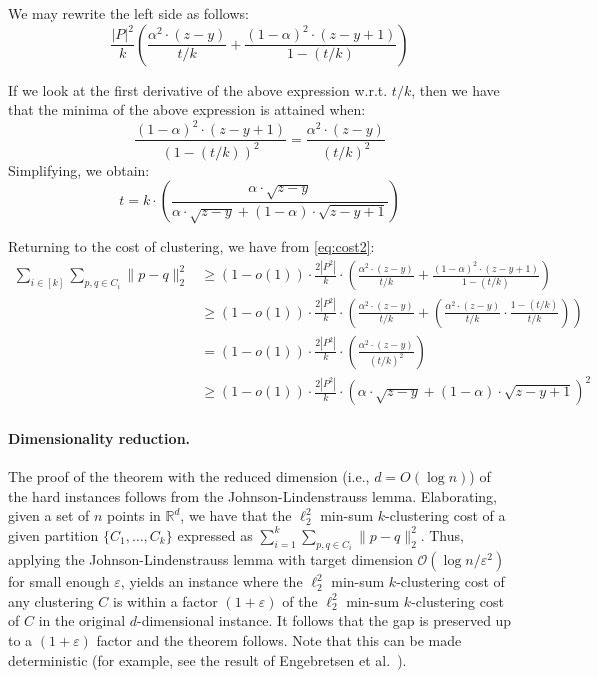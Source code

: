 \documentclass[10pt,a4paper]{amsart}
\renewcommand{\O}[1]{\ensuremath{\mathcal{O}\left(#1\right)}}
\newcommand{\eps}{\varepsilon}
\begin{document}
We may rewrite the left side as follows:
$$ \frac{|P|^2}{k}\left(   \frac{\alpha^2\cdot (z-y) }{t/k}   +    \frac{(1-\alpha)^2\cdot (z-y+1)}{1-(t/k)}  \right)$$

If we look at the first derivative of the above expression w.r.t. $t/k$, then we have that the minima of the above expression is attained when:
$$\frac{(1-\alpha)^2\cdot (z-y+1)}{(1-(t/k))^2}=\frac{\alpha^2\cdot (z-y)}{(t/k)^2}$$
Simplifying, we obtain:
$$t=k\cdot \left(\frac{\alpha\cdot \sqrt{z-y}}{\alpha\cdot \sqrt{z-y}+(1-\alpha)\cdot \sqrt{z-y+1}}\right)$$




Returning to the cost of clustering, we have from \eqref{eq:cost2}:
\begin{align*}
 \sum_{i\in[k]}\sum_{p,q\in C_i}\|p-q\|_2^2 
&\geq   (1-o(1))\cdot  \frac{2|P^2|}{k} \cdot \left(   \frac{\alpha^2\cdot (z-y) }{t/k}   +    \frac{(1-\alpha)^2\cdot (z-y+1)}{1-(t/k)}  \right)\\
&\geq (1-o(1))\cdot  \frac{2|P^2|}{k} \cdot \left(   \frac{\alpha^2\cdot (z-y) }{t/k}   +  \left(\frac{\alpha^2\cdot (z-y) }{t/k} \cdot\frac{1-(t/k)}{t/k}\right) \right)\\
&=  (1-o(1))\cdot  \frac{2|P^2|}{k} \cdot \left(  \frac{\alpha^2\cdot (z-y) }{  (t/k)^2}  \right)\\
&\ge (1-o(1))\cdot  \frac{2|P^2|}{k} \cdot    \left(\alpha\cdot \sqrt{z-y}+(1-\alpha)\cdot \sqrt{z-y+1}\right)^{2} 
\end{align*} 

\paragraph{Dimensionality reduction.}
The proof of the theorem with the reduced dimension (i.e., $d=O(\log n)$) of the hard instances follows from the Johnson-Lindenstrauss lemma. 
Elaborating, given a set of $n$ points in $\mathbb{R}^d$, we have that the $\ell_2^2$ min-sum $k$-clustering cost of a given partition $\{C_1,\ldots,C_k\}$   expressed as $\sum_{i=1}^k   \sum_{p,q \in C_i} \|p-q\|^2_2$. 
Thus, applying the Johnson-Lindenstrauss lemma with target dimension $\O{\log n/\eps^2}$ for small enough $\eps$, yields an instance where the $\ell_2^2$ min-sum $k$-clustering cost of any clustering $C$ is within a factor $(1+\eps)$ of the $\ell_2^2$ min-sum $k$-clustering cost of $C$ in the original $d$-dimensional instance. 
It follows that the gap is preserved up to a $(1+\eps)$ factor and the theorem follows. 
Note that this can be made deterministic (for example, see the result of Engebretsen et al.~\cite{EIO02}). 
\end{document}
